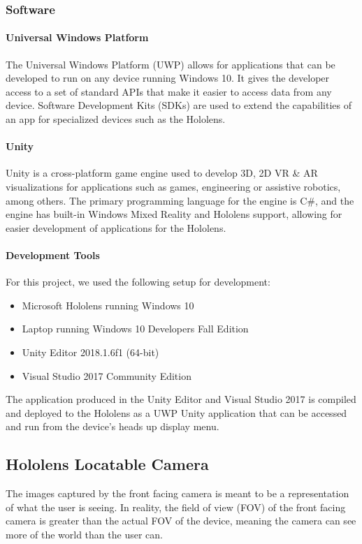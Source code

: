 \subsubsection{Software}
\paragraph{Universal Windows Platform} The Universal Windows Platform (UWP) allows for applications that can be developed to run on any device running Windows 10. It gives the developer access to a set of standard APIs that make it easier to access data from any device. Software Development Kits (SDKs) are used to extend the capabilities of an app for specialized devices such as the Hololens.

\paragraph{Unity} Unity is a cross-platform game engine used to develop 3D, 2D VR \& AR visualizations for applications such as games, engineering or assistive robotics, among others. The primary programming language for the engine is C\#, and the engine has built-in Windows Mixed Reality and Hololens support, allowing for easier development of applications for the Hololens. 

\paragraph{Development Tools} For this project, we used the following setup for development:

\begin{itemize}
    \item Microsoft Hololens running Windows 10
    \item Laptop running Windows 10 Developers Fall Edition
    \item Unity Editor 2018.1.6f1 (64-bit)
    \item Visual Studio 2017 Community Edition
\end{itemize}

The application produced in the Unity Editor and Visual Studio 2017 is compiled and deployed to the Hololens as a UWP Unity application that can be accessed and run from the device's heads up display menu.

\subsection{Hololens Locatable Camera}
The images captured by the front facing camera is meant to be a representation of what the user is seeing. In reality, the field of view (FOV) of the front facing camera is greater than the actual FOV of the device, meaning the camera can see more of the world than the user can. 

